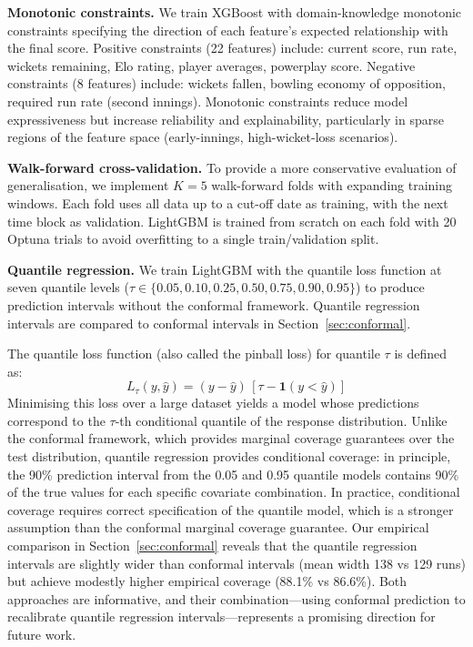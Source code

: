 \documentclass[10pt,a4paper,twocolumn]{article}
\begin{document}
\textbf{Monotonic constraints.} We train XGBoost with domain-knowledge monotonic constraints specifying the direction of each feature's expected relationship with the final score. Positive constraints (22 features) include: current score, run rate, wickets remaining, Elo rating, player averages, powerplay score. Negative constraints (8 features) include: wickets fallen, bowling economy of opposition, required run rate (second innings). Monotonic constraints reduce model expressiveness but increase reliability and explainability, particularly in sparse regions of the feature space (early-innings, high-wicket-loss scenarios).

\textbf{Walk-forward cross-validation.} To provide a more conservative evaluation of generalisation, we implement $K = 5$ walk-forward folds with expanding training windows. Each fold uses all data up to a cut-off date as training, with the next time block as validation. LightGBM is trained from scratch on each fold with 20 Optuna trials to avoid overfitting to a single train/validation split.

\textbf{Quantile regression.} We train LightGBM with the quantile loss function at seven quantile levels ($\tau \in \{0.05, 0.10, 0.25, 0.50, 0.75, 0.90, 0.95\}$) to produce prediction intervals without the conformal framework. Quantile regression intervals are compared to conformal intervals in Section~\ref{sec:conformal}.

The quantile loss function (also called the pinball loss) for quantile $\tau$ is defined as:
\begin{equation}
L_\tau(y, \hat{y}) = (y - \hat{y})\,[\tau - \mathbf{1}(y < \hat{y})]
\label{eq:pinball}
\end{equation}
Minimising this loss over a large dataset yields a model whose predictions correspond to the $\tau$-th conditional quantile of the response distribution. Unlike the conformal framework, which provides marginal coverage guarantees over the test distribution, quantile regression provides conditional coverage: in principle, the 90\% prediction interval from the 0.05 and 0.95 quantile models contains 90\% of the true values for each specific covariate combination. In practice, conditional coverage requires correct specification of the quantile model, which is a stronger assumption than the conformal marginal coverage guarantee. Our empirical comparison in Section~\ref{sec:conformal} reveals that the quantile regression intervals are slightly wider than conformal intervals (mean width 138 vs 129 runs) but achieve modestly higher empirical coverage (88.1\% vs 86.6\%). Both approaches are informative, and their combination---using conformal prediction to recalibrate quantile regression intervals---represents a promising direction for future work.
\end{document}

